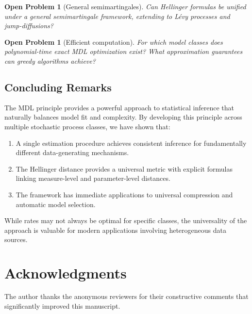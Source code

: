 \documentclass[preprint,review,12pt]{article}
\newtheorem{openproblem}[theorem]{Open Problem}
\begin{document}
\begin{openproblem}[General semimartingales]
Can Hellinger formulas be unified under a general semimartingale framework, 
extending to Lévy processes and jump-diffusions?
\end{openproblem}

\begin{openproblem}[Efficient computation]
For which model classes does polynomial-time exact MDL optimization exist? 
What approximation guarantees can greedy algorithms achieve?
\end{openproblem}

\subsection{Concluding Remarks}

The MDL principle provides a powerful approach to statistical inference that 
naturally balances model fit and complexity. By developing this principle 
across multiple stochastic process classes, we have shown that:

\begin{enumerate}
\item A single estimation procedure achieves consistent inference for 
fundamentally different data-generating mechanisms.

\item The Hellinger distance provides a universal metric with explicit 
formulas linking measure-level and parameter-level distances.

\item The framework has immediate applications to universal compression 
and automatic model selection.
\end{enumerate}

While rates may not always be optimal for specific classes, the universality 
of the approach is valuable for modern applications involving heterogeneous 
data sources.

\section*{Acknowledgments}

The author thanks the anonymous reviewers for their constructive comments 
that significantly improved this manuscript.
\end{document}

